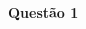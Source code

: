\documentclass[oneside,12pt]{article}
\begin{document}
\newpage


\def\barra {\scalebox{0.4}{$\ga{barranco}$}}
\def\barral{\ga{barranco com linhas}}

$\begin{matrix}
 \barra & \barra & \barra \\ \\
 \barra & \barra & \barra \\
 \end{matrix}
$




\newpage

%                                           

{\bf Questão 1}
\end{document}
